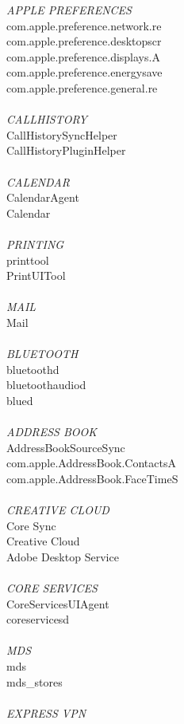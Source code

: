 \textit{APPLE PREFERENCES}\\
com.apple.preference.network.re\\
com.apple.preference.desktopscr\\
com.apple.preference.displays.A\\
com.apple.preference.energysave\\
com.apple.preference.general.re\\
\\
\textit{CALLHISTORY}\\
CallHistorySyncHelper\\
CallHistoryPluginHelper\\
\\
\textit{CALENDAR}\\
CalendarAgent\\
Calendar\\
\\
\textit{PRINTING}\\
printtool\\
PrintUITool\\
\\
\textit{MAIL}\\
Mail\\
\\
\textit{BLUETOOTH}\\
bluetoothd\\
bluetoothaudiod\\
blued\\
\\
\textit{ADDRESS BOOK}\\
AddressBookSourceSync\\
com.apple.AddressBook.ContactsA\\
com.apple.AddressBook.FaceTimeS\\
\\
\textit{CREATIVE CLOUD}\\
Core Sync\\
Creative Cloud\\
Adobe Desktop Service\\
\\
\textit{CORE SERVICES}\\
CoreServicesUIAgent\\
coreservicesd\\
\\
\textit{MDS}\\
mds\\
mds\_stores\\
\\
\textit{EXPRESS VPN}\\
